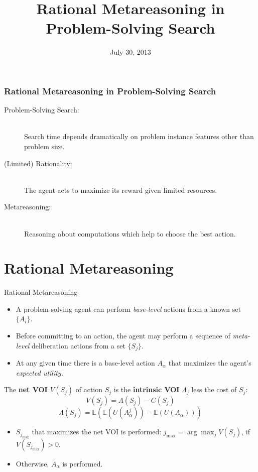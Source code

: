 \documentclass{beamer}
\title{Rational Metareasoning in Problem-Solving Search}
\date{July 30, 2013}
\begin{document}
\begin{frame}
\titlepage
\end{frame}

\begin{frame}
\frametitle{Rational Metareasoning in Problem-Solving Search}
\begin{description}
\item[Problem-Solving Search:] \hfill\\ Search time depends dramatically on
  problem instance features other than problem size.
\item[(Limited) Rationality:] \hfill\\ The agent acts to maximize its reward given
  limited resources.
\item[Metareasoning:] \hfill\\ Reasoning about computations which help to
  choose the best action.
\end{description}
\end{frame}

\begin{frame}
\tableofcontents
\end{frame}

\section{Rational Metareasoning}

\begin{frame}{Rational Metareasoning}
\begin{itemize}
\item A problem-solving agent can perform {\it base-level} actions from a known
          set $\{A_i\}$.
\item Before committing to an action, the agent may perform a sequence of
          {\it meta-level} deliberation actions from a set $\{S_j\}$.
\item At any given time there is a base-level action $A_\alpha$ that maximizes
          the agent's {\it expected utility.}
\end{itemize}

          The {\bf net VOI $V(S_j)$} of action $S_j$ is the {\bf intrinsic VOI} $\Lambda_j$ less the cost of $S_j$:
          \[V(S_j)=\Lambda(S_j)-C(S_j)\]
           \[\Lambda(S_j)=\mathbb{E}\left(\mathbb{E}(U(A_\alpha^j))-\mathbb{E}(U(A_\alpha))\right)\]

\begin{itemize} 
\item  $S_{j_{\max}}$ that maximizes the net VOI  is performed: $j_{\max} = \arg\max_jV(S_j)$, if $V(S_{j_{\max}})>0$.
\item Otherwise, $A_\alpha$ is performed.
\end{itemize}
\end{frame}
\end{document}
